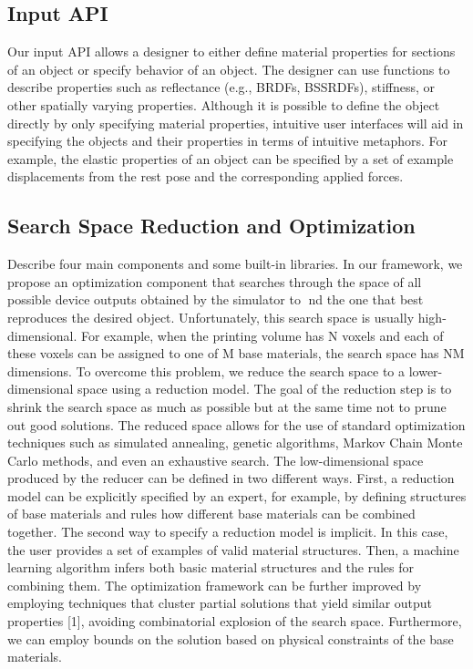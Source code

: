 \documentclass[annual]{acmsiggraph}
\begin{document}
\subsection{Input API}
Our input API allows a designer to either
define material properties for sections of an object
or specify behavior of an object. 
The designer
can use functions to describe properties such as reflectance (e.g., BRDFs, BSSRDFs), 
stiffness, or other spatially varying properties. 
Although it is possible to define the object directly by only specifying material
properties, intuitive user
interfaces will aid in specifying the objects and their properties
in terms of intuitive metaphors.
For example, the elastic properties of an object can be specified by a set of
example displacements from the rest pose and the corresponding applied forces.
\subsection{Search Space Reduction and Optimization}
Describe four main components and some built-in libraries.
In our
framework, we propose an optimization component that
searches through the space of all possible device outputs
obtained by the simulator to nd the one that best reproduces
the desired object. Unfortunately, this search space
is usually high-dimensional. For example, when the printing
volume has N voxels and each of these voxels can be
assigned to one of M base materials, the search space
has NM dimensions. To overcome this problem, we reduce
the search space to a lower-dimensional space using
a reduction model. The goal of the reduction step is to
shrink the search space as much as possible but at the
same time not to prune out good solutions. The reduced
space allows for the use of standard optimization techniques such as simulated annealing, genetic algorithms,
Markov Chain Monte Carlo methods, and even an exhaustive search. The low-dimensional space produced by the
reducer can be defined in two different ways. First, a reduction model can be explicitly specified by an expert, for
example, by defining structures of base materials and rules how different base materials can be combined together.
The second way to specify a reduction model is implicit. In this case, the user provides a set of examples of
valid material structures. Then, a machine learning algorithm infers both basic material structures and the rules
for combining them. The optimization framework can be further improved by employing techniques that cluster
partial solutions that yield similar output properties [1], avoiding combinatorial explosion of the search space.
Furthermore, we can employ bounds on the solution based on physical constraints of the base materials.
\end{document}
